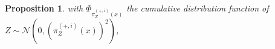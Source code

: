 \documentclass[12pt]{article}
\theoremstyle{Theorem}
\newtheorem{Proposition}[Theorem]{Proposition}
\theoremstyle{definition}
\begin{document}
\begin{Proposition}
with $\Phi_{\pi^{\scriptscriptstyle(+, i)}_{Z}(x)}$ the cumulative distribution function of $Z \sim \mathcal{N}(0, (\pi^{\scriptscriptstyle(+, i)}_{Z}(x))^{2})$, 
\end{Proposition}
\end{document}

